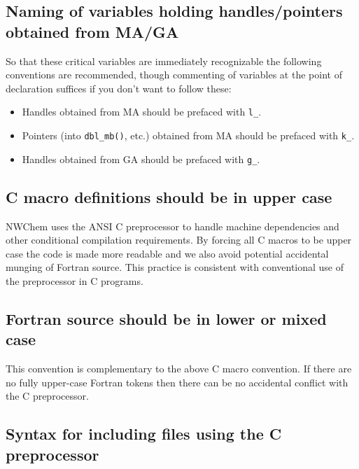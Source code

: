 \subsection{Naming of variables holding handles/pointers obtained from
  MA/GA}

So that these critical variables are immediately recognizable the
following conventions are recommended, though commenting of
variables at the point of declaration suffices if you don't want to
follow these:
\begin{itemize}
\item Handles obtained from MA should be prefaced with {\tt l\_}.
\item Pointers (into {\tt dbl\_mb()}, etc.) obtained from MA should be
  prefaced with {\tt k\_}.
\item Handles obtained from GA should be prefaced with {\tt g\_}.
\end{itemize}

\subsection{C macro definitions should be in upper case}

NWChem uses the ANSI C preprocessor to handle machine dependencies and
other conditional compilation requirements.  By forcing all C macros
to be upper case the code is made more readable and we also avoid
potential accidental munging of Fortran source.  This practice is
consistent with conventional use of the preprocessor in C programs.

\subsection{Fortran source should be in lower or mixed case}

This convention is complementary to the above C macro convention.
If there are no fully upper-case Fortran tokens then there can
be no accidental conflict with the C preprocessor.

\subsection{Syntax for including files using the C preprocessor}

